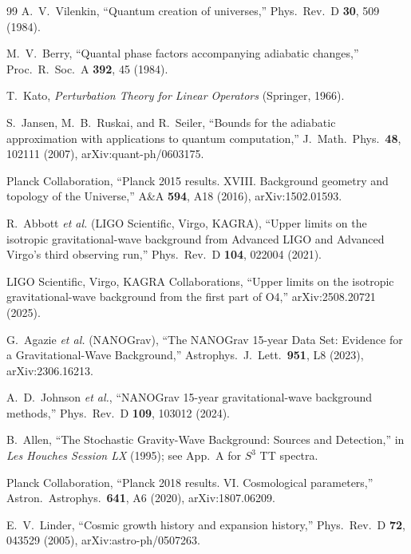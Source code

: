 \documentclass[aps,prd,twocolumn,amsmath,amssymb,nofootinbib,superscriptaddress]{revtex4-2}
\begin{document}
\begin{thebibliography}{99}
A.~V.~Vilenkin, ``Quantum creation of universes,''
Phys.\ Rev.\ D \textbf{30}, 509 (1984).

M.~V.~Berry, ``Quantal phase factors accompanying adiabatic changes,''
Proc.\ R.\ Soc.\ A \textbf{392}, 45 (1984).

T.~Kato, \emph{Perturbation Theory for Linear Operators} (Springer, 1966).

S.~Jansen, M.~B.~Ruskai, and R.~Seiler,
``Bounds for the adiabatic approximation with applications to quantum computation,''
J.\ Math.\ Phys.\ \textbf{48}, 102111 (2007), arXiv:quant-ph/0603175.

Planck Collaboration,
``Planck 2015 results. XVIII. Background geometry and topology of the Universe,''
A\&A \textbf{594}, A18 (2016), arXiv:1502.01593.

R.~Abbott \textit{et al.} (LIGO Scientific, Virgo, KAGRA),
``Upper limits on the isotropic gravitational-wave background from Advanced LIGO and Advanced Virgo’s third observing run,''
Phys.\ Rev.\ D \textbf{104}, 022004 (2021).

LIGO Scientific, Virgo, KAGRA Collaborations,
``Upper limits on the isotropic gravitational-wave background from the first part of O4,''
arXiv:2508.20721 (2025).

G.~Agazie \textit{et al.} (NANOGrav), ``The NANOGrav 15-year Data Set: Evidence for a Gravitational-Wave Background,''
Astrophys.\ J.\ Lett.\ \textbf{951}, L8 (2023), arXiv:2306.16213.

A.~D.~Johnson \textit{et al.}, ``NANOGrav 15-year gravitational-wave background methods,''
Phys.\ Rev.\ D \textbf{109}, 103012 (2024).

B.~Allen, ``The Stochastic Gravity-Wave Background: Sources and Detection,''
in \emph{Les Houches Session LX} (1995); see App.~A for $S^3$ TT spectra.

Planck Collaboration,
``Planck 2018 results. VI. Cosmological parameters,''
Astron.\ Astrophys.\ \textbf{641}, A6 (2020), arXiv:1807.06209.

E.~V.~Linder, ``Cosmic growth history and expansion history,''
Phys.\ Rev.\ D \textbf{72}, 043529 (2005), arXiv:astro-ph/0507263.
\end{thebibliography}
\end{document}
